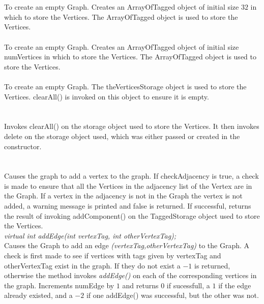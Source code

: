   \\
  \\
To create an empty Graph. Creates an ArrayOfTagged object of initial
size $32$ in which to store the Vertices. The ArrayOfTagged object is
used to store the Vertices.\\

 \\
To create an empty Graph. Creates an ArrayOfTagged object of initial
size \p numVertices in which to store the Vertices. The
ArrayOfTagged object is used to store the Vertices. \\ 

\\ 
To create an empty Graph. The \p theVerticesStorage object is used to
store the Vertices. clearAll() is invoked on this object to
ensure it is empty. \\

  \\
  \\
Invokes clearAll() on the storage object used to store the
Vertices. It then invokes delete on the storage object used, which was
either passed or created in the constructor. \\

  \\
 \\
Causes the graph to add a vertex to the graph. If \p checkAdjacency
is \p true, a check is made to ensure that all the Vertices in the
adjacency list of the Vertex are in the Graph. If a vertex in the
adjacency is not in the Graph the vertex is not added, a warning
message is printed and \p false is returned. If successful,
returns the result of invoking addComponent() on the
TaggedStorage object used to store the Vertices. \\



{\em virtual int addEdge(int vertexTag, int otherVertexTag); } \\
Causes the Graph to add an edge {\em (vertexTag,otherVertexTag)} to
the Graph. A check is first made to see if vertices with tags given by
\p vertexTag and \p otherVertexTag exist in the graph. If they
do not exist a $-1$ is returned, otherwise the method invokes {\em
addEdge()} on each of the corresponding vertices in the 
graph. Increments \p numEdge by $1$ and returns $0$ if sucessfull,
a $1$ if the edge already existed, and a $-2$ if one addEdge()
was successful, but the other was not.\\  

